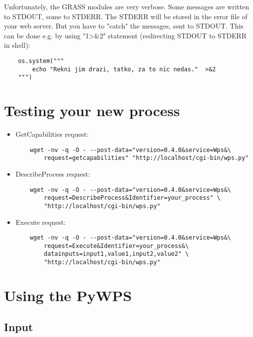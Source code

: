 \documentclass[a4paper,11pt]{article}
\begin{document}
     
    Unfortunately, the GRASS modules are very verbose. Some messages are
    written to STDOUT, some to STDERR. The STDERR will be stored in the error
    file of your web server. But you have to "catch" the messages, sent to
    STDOUT. This can be done e.g. by using "1>\&2" statement (redirecting STDOUT
    to STDERR in shell):
     

    \begin{verbatim}
    os.system("""
        echo "Rekni jim drazi, tatko, za to nic nedas."  >&2
    """)
    \end{verbatim}

    
    \section{Testing your new process}

    \begin{itemize}
        \item GetCapabilities request:
\begin{verbatim}
    wget -nv -q -O - --post-data="version=0.4.0&service=Wps&\
        request=getcapabilities" "http://localhost/cgi-bin/wps.py"
\end{verbatim}
         
        \item DescribeProcess request:
\begin{verbatim}
    wget -nv -q -O - --post-data="version=0.4.0&service=Wps&\
        request=DescribeProcess&Identifier=your_process" \
        "http://localhost/cgi-bin/wps.py"
\end{verbatim}
         
        \item Execute request:
\begin{verbatim}
    wget -nv -q -O - --post-data="version=0.4.0&service=Wps&\
        request=Execute&Identifier=your_process&\
        datainputs=input1,value1,input2,value2" \
        "http://localhost/cgi-bin/wps.py"
\end{verbatim}
         
    \end{itemize}

    
    \section{Using the PyWPS}
    \subsection{Input}
     
\end{document}

